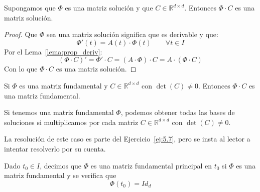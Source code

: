 \begin{prop}
    Supongamos que $\Phi$ es una matriz solución y que $C\in \mathbb{R}^{d\times d}$. Entonces $\Phi\cdot C$ es una matriz solución.
    \begin{proof}
        Que $\Phi$ sea una matriz solución significa que es derivable y que:
        \begin{equation*}
            \Phi'(t) = A(t)\cdot \Phi(t) \qquad \forall t\in I
        \end{equation*}
        Por el Lema~\ref{lema:prop_deriv}:
        \begin{equation*}
            (\Phi\cdot C)' = \Phi'\cdot C = (A\cdot \Phi)\cdot C = A\cdot (\Phi \cdot C)
        \end{equation*}
        Con lo que $\Phi\cdot C$ es una matriz solución.
    \end{proof}
\end{prop}

\begin{coro}\label{cor:matriz_fundamental}
    Si $\Phi$ es una matriz fundamental y $C\in \mathbb{R}^{d\times d}$ con $\det(C)\neq 0$. Entonces $\Phi\cdot C$ es una matriz fundamental.
\end{coro}

\begin{ejercicio*}
    Si tenemos una matriz fundamental $\Phi$, podemos obtener todas las bases de soluciones si multiplicamos por cada matriz $C\in \mathbb{R}^{d\times d}$ con $\det(C)\neq 0$.

    La resolución de este caso es parte del Ejercicio~\ref{ej:5.7}, pero se insta al lector a intentar resolverlo por su cuenta.
\end{ejercicio*}

\begin{definicion}
    Dado $t_0\in I$, decimos que $\Phi$ es una matriz fundamental principal en $t_0$ si $\Phi$ es una matriz fundamental y se verifica que
    \begin{equation*}
        \Phi(t_0) = Id_{d}
    \end{equation*}
\end{definicion}

